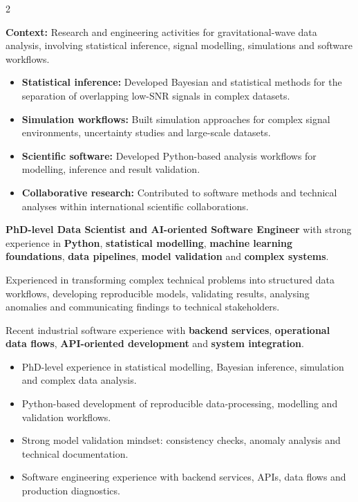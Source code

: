 \documentclass[8pt,a4paper,ragged2e,withhyper]{altacv}
\begin{document}
\begin{paracol}{2}
\divider


\textbf{Context:} Research and engineering activities for gravitational-wave data analysis, involving statistical inference, signal modelling, simulations and software workflows.

\begin{itemize}
\item \textbf{Statistical inference:} Developed Bayesian and statistical methods for the separation of overlapping low-SNR signals in complex datasets.
\item \textbf{Simulation workflows:} Built simulation approaches for complex signal environments, uncertainty studies and large-scale datasets.
\item \textbf{Scientific software:} Developed Python-based analysis workflows for modelling, inference and result validation.
\item \textbf{Collaborative research:} Contributed to software methods and technical analyses within international scientific collaborations.
\end{itemize}

\switchcolumn


\textbf{PhD-level Data Scientist and AI-oriented Software Engineer} with strong experience in \textbf{Python}, \textbf{statistical modelling}, \textbf{machine learning foundations}, \textbf{data pipelines}, \textbf{model validation} and \textbf{complex systems}.

Experienced in transforming complex technical problems into structured data workflows, developing reproducible models, validating results, analysing anomalies and communicating findings to technical stakeholders.

Recent industrial software experience with \textbf{backend services}, \textbf{operational data flows}, \textbf{API-oriented development} and \textbf{system integration}.


\begin{itemize}
  \item PhD-level experience in statistical modelling, Bayesian inference, simulation and complex data analysis.
  \item Python-based development of reproducible data-processing, modelling and validation workflows.
  \item Strong model validation mindset: consistency checks, anomaly analysis and technical documentation.
  \item Software engineering experience with backend services, APIs, data flows and production diagnostics.
\end{itemize}


\end{paracol}
\end{document}
